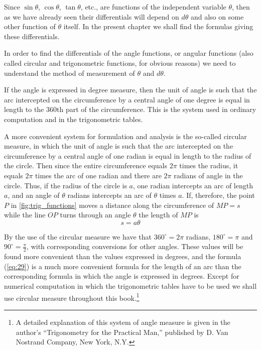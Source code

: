 Since $\sin \theta$, $\cos \theta$, $\tan \theta$, etc., are functions of the independent variable $\theta$, then as we have already seen their differentials will depend on $d\theta$ and also on some other function of $\theta$ itself. In the present chapter we shall find the formulas giving these differentials.

In order to find the differentials of the angle functions, or angular functions (also called circular and trigonometric functions, for obvious reasons) we need to understand the method of measurement of $\theta$ and $d\theta$.

If the angle is expressed in degree measure, then the unit of angle is such that the arc intercepted on the circumference by a central angle of one degree is equal in length to the 360th part of the circumference. This is the system used in ordinary computation and in the trigonometric tables.

A more convenient system for formulation and analysis is the so-called circular measure, in which the unit of angle is such that the arc intercepted on the circumference by a central angle of one radian is equal in length to the radius of the circle. Then since the entire circumference equals $2\pi$ times the radius, it equals $2\pi$ times the arc of one radian and there are $2\pi$ radians of angle in the circle. Thus, if the radius of the circle is $a$, one radian intercepts an arc of length $a$, and an angle of $\theta$ radians intercepts an arc of $\theta$ times $a$. If, therefore, the point $P$ in \autoref{fig:trig_functions} moves a distance along the circumference of $MP = s$ while the line $OP$ turns through an angle $\theta$ the length of $MP$ is
\begin{equation}
s = a\theta \tag{29}\label{eq:29}
\end{equation}

By the use of the circular measure we have that $360^\circ = 2\pi$ radians, $180^\circ = \pi$ and $90^\circ = \frac{\pi}{2}$, with corresponding conversions for other angles. These values will be found more convenient than the values expressed in degrees, and the formula (\eqref{eq:29}) is a much more convenient formula for the length of an arc than the corresponding formula in which the angle is expressed in degrees. Except for numerical computation in which the trigonometric tables have to be used we shall use circular measure throughout this book.\footnote{A detailed explanation of this system of angle measure is given in the author's ``Trigonometry for the Practical Man,'' published by D. Van Nostrand Company, New York, N.Y.}

